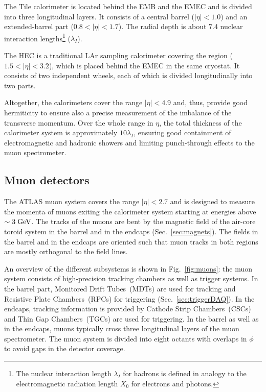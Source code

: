 The Tile calorimeter is located behind the EMB and the EMEC and is divided into three longitudinal layers.
It consists of a central barrel (\mbox{$|\eta| < 1.0$}) and an extended-barrel part (\mbox{$0.8 < |\eta| < 1.7$}).
The radial depth is about 7.4 nuclear interaction
lengths\footnote{The nuclear interaction length $\lambda_I$ for hadrons is defined in analogy to the electromagnetic radiation length $X_0$
for electrons and photons.} ($\lambda_I$).

The HEC is a traditional LAr sampling calorimeter covering the region (\mbox{$1.5 < |\eta| < 3.2$}), which is placed behind the EMEC in the same
cryostat.
It consists of two independent wheels, each of which is divided longitudinally into two parts.

Altogether, the calorimeters cover the range \mbox{$|\eta| < 4.9$} and, thus, provide good hermiticity to ensure also a precise measurement
of the imbalance of the transverse momentum.
Over the whole range in $\eta$, the total thickness of the calorimeter system is approximately \mbox{$10 \lambda_I$}, ensuring good containment of
electromagnetic and hadronic showers and limiting punch-through effects to the muon spectrometer.

\subsection{Muon detectors}
\label{sec:muonspectrometer}

The ATLAS muon system covers the range \mbox{$|\eta| < 2.7$} and is designed to measure the momenta of muons exiting the calorimeter system starting
at energies above \mbox{$\sim 3 \; \mathrm{GeV}$}.
The tracks of the muons are bent by the magnetic field of the air-core toroid system in the barrel and in the endcaps (Sec.~\ref{sec:magnets}).
The fields in the barrel and in the endcaps are oriented such that muon tracks in both regions are mostly orthogonal to the field lines.

An overview of the different subsystems is shown in Fig.~\ref{fig:muons}:
the muon system consists of high-precision tracking chambers as well as trigger systems.
In the barrel part, Monitored Drift Tubes~(MDTs) are used for tracking and Resistive Plate Chambers~(RPCs) for triggering (Sec.~\ref{sec:triggerDAQ}).
In the endcaps, tracking information is provided by Cathode Strip Chambers~(CSCs) and Thin Gap Chambers~(TGCs) are used for triggering.
In the barrel as well as in the endcaps, muons typically cross three longitudinal layers of the muon spectrometer.
The muon system is divided into eight octants with overlaps in $\phi$ to avoid gaps in the detector coverage.

